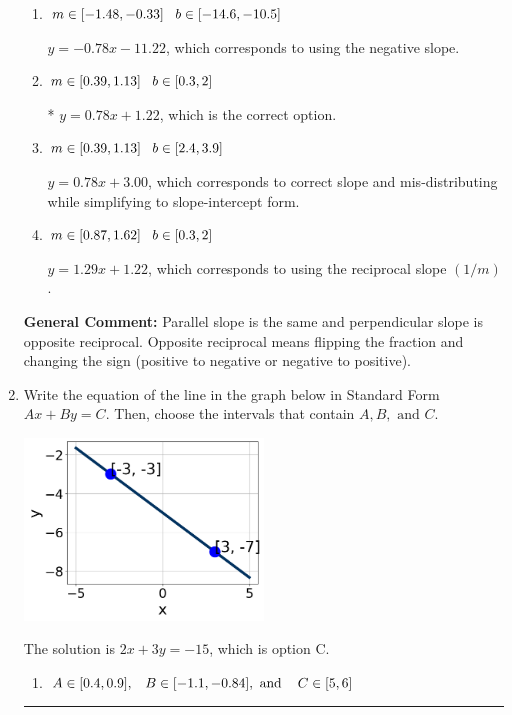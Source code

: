 \documentclass{extbook}[14pt]
\newcommand{\litem}[1]{\item #1

\rule{\textwidth}{0.4pt}}
\begin{document}
\begin{enumerate}
{\begin{enumerate}[label=\Alph*.]
 $y = 0.78x - 1.22$, which corresponds to using the correct slope and getting the negative $y$-intercept.
\item \( m \in [-1.48, -0.33] \hspace*{3mm} b \in [-14.6, -10.5] \)

 $y = -0.78x - 11.22$, which corresponds to using the negative slope.
\item \( m \in [0.39, 1.13] \hspace*{3mm} b \in [0.3, 2] \)

* $y = 0.78x + 1.22$, which is the correct option.
\item \( m \in [0.39, 1.13] \hspace*{3mm} b \in [2.4, 3.9] \)

 $y = 0.78x + 3.00$, which corresponds to correct slope and mis-distributing while simplifying to slope-intercept form.
\item \( m \in [0.87, 1.62] \hspace*{3mm} b \in [0.3, 2] \)

 $y = 1.29x + 1.22$, which corresponds to using the reciprocal slope $(1/m)$.
\end{enumerate}

\textbf{General Comment:} Parallel slope is the same and perpendicular slope is opposite reciprocal. Opposite reciprocal means flipping the fraction and changing the sign (positive to negative or negative to positive).
}
\litem{
Write the equation of the line in the graph below in Standard Form $Ax+By=C$. Then, choose the intervals that contain $A, B, \text{ and } C$.

\begin{center}
    \includegraphics[width=0.5\textwidth]{../Figures/linearGraphToStandardCopyC.png}
\end{center}


The solution is \( 2x + 3y = -15 \), which is option C.\begin{enumerate}[label=\Alph*.]
\item \( A \in [0.4, 0.9], \hspace{3mm} B \in [-1.1, -0.84], \text{ and } \hspace{3mm} C \in [5, 6] \)


\end{enumerate}}
\end{enumerate}
\end{document}
